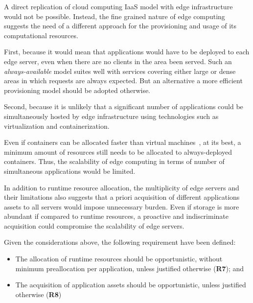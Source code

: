 


A direct replication of cloud computing IaaS model with edge infrastructure would not be possible. Instead, the fine grained nature of edge computing suggests the need of a different approach for the provisioning and usage of its computational resources. 

First, because it would mean that applications would have to be deployed to each edge server, even when there are no clients in the area been served. Such an \textit{always-available} model suites well with services covering either large or dense areas in which requests are always expected. But an alternative a more efficient provisioning model should be adopted otherwise.

Second, because it is unlikely that a significant number of applications could be simultaneously hosted by edge infrastructure using technologies such as virtualization and containerization. 

Even if containers can be allocated faster than virtual machines~\cite{Giovanni?}, at its best, a minimum amount of resources still needs to be allocated to always-deployed containers. Thus, the scalability of edge computing in terms of number of simultaneous applications would be limited. 
	
In addition to runtime resource allocation, the multiplicity of edge servers and their limitations also suggests that a priori acquisition of different applications assets to all servers would impose unnecessary burden. Even if storage is more abundant if compared to runtime resources, a proactive and indiscriminate acquisition could compromise the scalability of edge servers. 

\noindent Given the considerations above, 
the following requirement have been defined:

\begin{itemize}

\item The allocation of runtime resources should be opportunistic, without minimum preallocation per application, unless justified otherwise (\textbf{R7}); and

\item The acquisition of application assets should be opportunistic, unless justified otherwise (\textbf{R8})

\end{itemize} 

